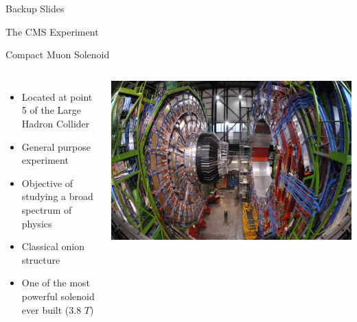 \documentclass[8pt]{beamer}
\begin{document}
\appendix
\begin{frame}
 
\begin{block}

\begin{center}Backup Slides\end{center}

\end{block}

\end{frame}

\begin{frame}{The CMS Experiment}
 
\begin{block}{Compact Muon Solenoid}

    \begin{columns}
      \column[t]{6.5cm}

      \begin{itemize}
        \item Located at point 5 of the Large Hadron Collider 
        \item General purpose experiment
        \item Objective of studying a broad spectrum of physics
        \item Classical onion structure
        \item One of the most powerful solenoid ever built (3.8 $T$)
      \end{itemize}  

      \column[t]{4.5cm}
      \begin{center}
        \includegraphics[width=1.00\textwidth]{img/CMSOpen.jpg} 
      \end{center}


\end{columns}
\end{block}
\end{frame}
\end{document}
